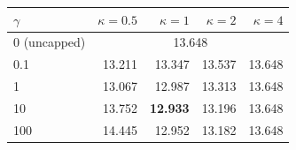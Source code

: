 \begin{tabular}{lrrrr}
\toprule
$\gamma$ & $\kappa=0.5$ & $\kappa=1$ & $\kappa=2$ & $\kappa=4$ \\
\midrule
0 (uncapped) & \multicolumn{4}{c}{13.648} \\
0.1 & 13.211 & 13.347 & 13.537 & 13.648 \\
1 & 13.067 & 12.987 & 13.313 & 13.648 \\
10 & 13.752 & \textbf{12.933} & 13.196 & 13.648 \\
100 & 14.445 & 12.952 & 13.182 & 13.648 \\
\bottomrule
\end{tabular}
